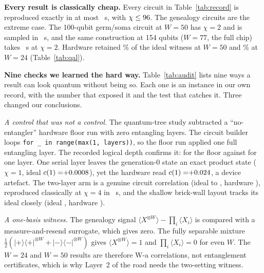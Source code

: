 \documentclass[conference]{IEEEtran}
\begin{document}


\textbf{Every result is classically cheap.} Every circuit in Table~\ref{tab:record} is reproduced exactly in at most
\costMaxS{}~s, with $\chi\le96{}$. The genealogy circuits are the extreme case. The 100-qubit germ/soma
circuit at $W=50$ has $\chi=2$ and is sampled in \costPjFifty{}~s, and the same construction at 154 qubits ($W=77$,
the full chip) takes \costPjSevenSeven{}~s at $\chi=2$. Hardware retained \pjFiftyRetainPct{}\% of the ideal witness
at $W=50$ and \mFourTwentyFourRetainPct{}\% at $W=24$ (Table~\ref{tab:qal}).

\begin{table}[t]
\centering
\caption{Genealogy witness $\langle X^{\otimes W}\rangle$ on \texttt{ibm\_kingston} against its exact ideal and
the exact classical cost (one eight-core machine, MPS, $\chi=2$ in every row). Month~4: three repeats, mutation
scale 0.08 (hardware angles from a certified entropy service; ideal with pseudo-random angles of the same scale).
Germ/soma: one run per width, no mutation; steps grow with $W$. W-a rung.}
\label{tab:qal}
\scriptsize
\setlength{\tabcolsep}{3pt}

\end{table}

\textbf{Nine checks we learned the hard way.} Table~\ref{tab:audit} lists nine ways a result can look quantum without
being so. Each one is an instance in our own record, with the number that exposed it and the test that catches it.
Three changed our conclusions.



\emph{A control that was not a control.} The quantum-tree study subtracted a ``no-entangler'' hardware floor run with
zero entangling layers. The circuit builder loops \texttt{for \_ in range(max(1, layers))}, so the floor run applied
one full entangling layer. The recorded logical depth confirms it: \qtDepthFloor{} for the floor against
\qtDepthLone{} for one layer. One serial layer leaves the generation-0 state an exact product state ($\chi=1$, ideal
$c(1)=\qtIdealLoneMean{}$), yet the hardware read $c(1)=\qtHwLoneMean{}$, a device artefact. The two-layer arm is a
genuine circuit correlation (ideal \qtIdealLtwoMin{} to \qtIdealLtwoMax{}, hardware \qtHwLtwoMean{}), reproduced
classically at $\chi=4$ in \qtCostLtwo{}~s, and the shallow brick-wall layout tracks its ideal closely (ideal
\bwIdealLoneMean{}, hardware \bwHwLoneMean{}).

\emph{A one-basis witness.} The genealogy signal $\langle X^{\otimes W}\rangle-\prod_i\langle X_i\rangle$ is compared
with a measure-and-resend surrogate, which gives zero. The fully separable mixture
$\tfrac12(|{+}\rangle\langle{+}|^{\otimes W}+|{-}\rangle\langle{-}|^{\otimes W})$ gives $\langle X^{\otimes
W}\rangle=1$ and $\prod_i\langle X_i\rangle=0$ for even $W$. The $W=24$ and $W=50$ results are therefore W-a
correlations, not entanglement certificates, which is why Layer~2 of the road needs the two-setting witness.
\end{document}

